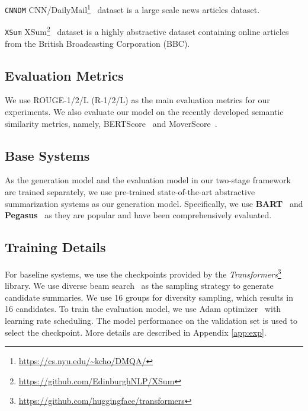 \documentclass[11pt,a4paper]{article}
\begin{document}
\noindent\texttt{CNNDM} CNN/DailyMail\footnote{\url{https://cs.nyu.edu/~kcho/DMQA/}}~\citep{10.5555/2969239.2969428,nallapati-etal-2016-abstractive} dataset is a large scale news articles dataset.

\noindent\texttt{XSum}
XSum\footnote{\url{https://github.com/EdinburghNLP/XSum}}~\citep{narayan-etal-2018-dont} dataset is a highly abstractive dataset containing online articles from the British Broadcasting Corporation (BBC).


\subsection{Evaluation Metrics}

We use ROUGE-1/2/L (R-1/2/L) as the main evaluation metrics for our experiments. 
We also evaluate our model on the recently developed semantic similarity metrics, namely, BERTScore~\citep{DBLP:conf/iclr/ZhangKWWA20} and MoverScore~\citep{zhao-etal-2019-moverscore}.

\subsection{Base Systems}

As the generation model and the evaluation model in our two-stage framework are trained separately, we use pre-trained state-of-the-art abstractive summarization systems as our generation model. 
Specifically, we use \textbf{BART}~\citep{lewis-etal-2020-bart} and \textbf{Pegasus}~\citep{zhang2020pegasus} as they are popular and have been comprehensively evaluated.

\subsection{Training Details}
For baseline systems, we use the checkpoints provided by the \textit{Transformers}\footnote{\url{https://github.com/huggingface/transformers}}~\citep{wolf-etal-2020-transformers} library. 
We use diverse beam search~\citep{DBLP:journals/corr/VijayakumarCSSL16} as the sampling strategy to generate candidate summaries.
We use 16 groups for diversity sampling, which results in 16 candidates.
To train the evaluation model, we use Adam optimizer~\citep{DBLP:journals/corr/KingmaB14} with learning rate scheduling.
The model performance on the validation set is used to select the checkpoint.
More details are described in Appendix \ref{app:exp}. 
\end{document}
